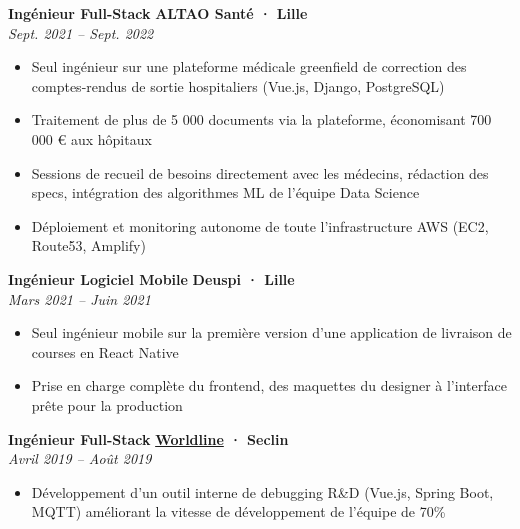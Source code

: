 \documentclass[a4paper,11pt]{article}
\newcommand{\expdivider}{\vspace{0.01cm}\noindent{\color{light!60!gray}\rule{\linewidth}{0.4pt}}\vspace{0.01cm}}
\begin{document}
\expdivider

\noindent\textbf{Ingénieur Full-Stack} \hfill \textbf{ALTAO Santé · Lille} \\
\textit{Sept. 2021 – Sept. 2022}
\begin{itemize}[nosep]
    \item Seul ingénieur sur une plateforme médicale greenfield de correction des comptes-rendus de sortie hospitaliers (Vue.js, Django, PostgreSQL)
    \item Traitement de plus de 5 000 documents via la plateforme, économisant 700 000 € aux hôpitaux
    \item Sessions de recueil de besoins directement avec les médecins, rédaction des specs, intégration des algorithmes ML de l'équipe Data Science
    \item Déploiement et monitoring autonome de toute l'infrastructure AWS (EC2, Route53, Amplify)
\end{itemize}

\expdivider

\noindent\textbf{Ingénieur Logiciel Mobile} \hfill \textbf{Deuspi · Lille} \\
\textit{Mars 2021 – Juin 2021}
\begin{itemize}[nosep]
    \item Seul ingénieur mobile sur la première version d'une application de livraison de courses en React Native
    \item Prise en charge complète du frontend, des maquettes du designer à l'interface prête pour la production
\end{itemize}

\expdivider

\noindent\textbf{Ingénieur Full-Stack} \hfill \textbf{\href{https://worldline.com}{Worldline} · Seclin} \\
\textit{Avril 2019 – Août 2019}
\begin{itemize}[nosep]
    \item Développement d'un outil interne de debugging R\&D (Vue.js, Spring Boot, MQTT) améliorant la vitesse de développement de l'équipe de 70\%
\end{itemize}
\end{document}
